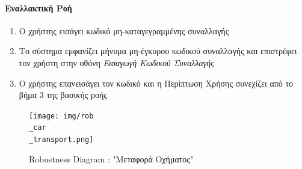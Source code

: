 \documentclass{../ol-softwaremanual}
\begin{document}
	\paragraph{Εναλλακτική Ροή}
	\begin{enumerate}
		\item Ο χρήστης εισάγει κωδικό μη-καταγεγραμμένης συναλλαγής
		\item Το σύστημα εμφανίζει μήνυμα μη-έγκυρου κωδικού συναλλαγής και επιστρέφει τον χρήστη στην οθόνη \textit{Εισαγωγή Κωδικού Συναλλαγής} 
		\item Ο χρήστης επανεισάγει τον κωδικό και η Περίπτωση Χρήσης συνεχίζει από το βήμα 3 της βασικής ροής
	\end{enumerate}
	
	\begin{figure}[htbp!]
		\texttt{[image: img/rob\\\_car\\\_transport.png]}
		\caption{\en Robustness Diagram : "\gr Μεταφορά Οχήματος\en"\gr}
	\end{figure}
	
	
	
	
	
	
	
	
	
	
\end{document}
